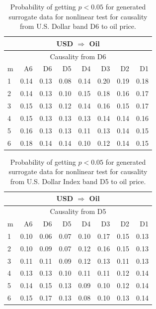 %
%
\begin{table}[H]
\begin{center}
\begin{tabular}{l|r r r r r r r}
\hline\hline
\multicolumn{8}{c}{USD $\Rightarrow$ Oil}\\
\hline
\multicolumn{8}{c}{Causality from D6}\\
\hline\hline
m & A6 & D6 & D5 & D4 & D3 & D2 & D1 \\
\hline
1 & 0.14 & 0.13 & 0.08 & 0.14 & 0.20 & 0.19 & 0.18 \\
2 & 0.14 & 0.13 & 0.10 & 0.15 & 0.18 & 0.16 & 0.17 \\
3 & 0.15 & 0.13 & 0.12 & 0.14 & 0.16 & 0.15 & 0.17 \\
4 & 0.15 & 0.13 & 0.13 & 0.13 & 0.14 & 0.14 & 0.16 \\
5 & 0.16 & 0.13 & 0.13 & 0.11 & 0.13 & 0.14 & 0.15 \\
6 & 0.18 & 0.14 & 0.14 & 0.10 & 0.12 & 0.14 & 0.15 \\
\hline\hline
\end{tabular}
\caption{Probability of getting $p < 0.05$ for generated surrogate data for nonlinear test for causality from U.S. Dollar band D6 to oil price.}
\end{center}
\end{table}

%
%
\begin{table}[H]
\begin{center}
\begin{tabular}{l|r r r r r r r}
\hline\hline
\multicolumn{8}{c}{USD $\Rightarrow$ Oil}\\
\hline
\multicolumn{8}{c}{Causality from D5}\\
\hline\hline
m & A6 & D6 & D5 & D4 & D3 & D2 & D1 \\
\hline
1 & 0.10 & 0.06 & 0.07 & 0.10 & 0.17 & 0.15 & 0.13 \\
2 & 0.10 & 0.09 & 0.07 & 0.12 & 0.16 & 0.15 & 0.13 \\
3 & 0.11 & 0.11 & 0.09 & 0.12 & 0.13 & 0.11 & 0.13 \\
4 & 0.13 & 0.13 & 0.10 & 0.11 & 0.11 & 0.12 & 0.14 \\
5 & 0.14 & 0.15 & 0.13 & 0.09 & 0.10 & 0.12 & 0.14 \\
6 & 0.15 & 0.17 & 0.13 & 0.08 & 0.10 & 0.13 & 0.14 \\
\hline\hline
\end{tabular}
\caption{Probability of getting $p < 0.05$ for generated surrogate data for nonlinear test for causality from U.S. Dollar Index band D5 to oil price.}
\end{center}
\end{table}

